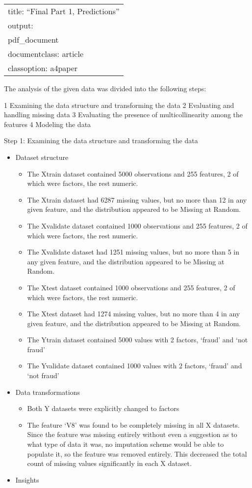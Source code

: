 \documentclass[
]{article}
\author{}
\date{\vspace{-2.5em}}
\providecommand{\tightlist}{%
  \setlength{\itemsep}{0pt}\setlength{\parskip}{0pt}}
\begin{document}
\begin{longtable}[]{@{}l@{}}
\toprule
\endhead
title: ``Final Part 1, Predictions''\tabularnewline
output:\tabularnewline
pdf\_document\tabularnewline
documentclass: article\tabularnewline
classoption: a4paper\tabularnewline
\bottomrule
\end{longtable}

The analysis of the given data was divided into the following steps:

1 Examining the data structure and transforming the data 2 Evaluating
and handling missing data 3 Evaluating the presence of multicollinearity
among the features 4 Modeling the data

Step 1: Examining the data structure and transforming the data

\begin{itemize}
\tightlist
\item
  Dataset structure

  \begin{itemize}
  \tightlist
  \item
    The Xtrain dataset contained 5000 observations and 255 features, 2
    of which were factors, the rest numeric.
  \item
    The Xtrain dataset had 6287 missing values, but no more than 12 in
    any given feature, and the distribution appeared to be Missing at
    Random.
  \item
    The Xvalidate dataset contained 1000 observations and 255 features,
    2 of which were factors, the rest numeric.
  \item
    The Xvalidate dataset had 1251 missing values, but no more than 5 in
    any given feature, and the distribution appeared to be Missing at
    Random.
  \item
    The Xtest dataset contained 1000 observations and 255 features, 2 of
    which were factors, the rest numeric.
  \item
    The Xtest dataset had 1274 missing values, but no more than 4 in any
    given feature, and the distribution appeared to be Missing at
    Random.
  \item
    The Ytrain dataset contained 5000 values with 2 factors, `fraud' and
    `not fraud'
  \item
    The Yvalidate dataset contained 1000 values with 2 factors, `fraud'
    and `not fraud'
  \end{itemize}
\item
  Data transformations

  \begin{itemize}
  \tightlist
  \item
    Both Y datasets were explicitly changed to factors
  \item
    The feature `V8' was found to be completely missing in all X
    datasets. Since the feature was missing entirely without even a
    suggestion as to what type of data it was, no imputation scheme
    would be able to populate it, so the feature was removed entirely.
    This decreased the total count of missing values significantly in
    each X dataset.
  \end{itemize}
\item
  Insights


\end{itemize}
\end{document}
